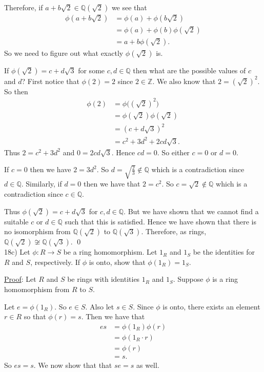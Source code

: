 \documentclass{article}
\begin{document}
Therefore, if $a + b\sqrt{2} \in \mathbb{Q}(\sqrt{2})$ we see that 
\begin{align*}
	\phi(a + b\sqrt{2}) &= \phi(a) + \phi(b\sqrt{2}) \\
	&= \phi(a) + \phi(b) \phi(\sqrt{2}) \\
	&= a + b \phi(\sqrt{2}).
\end{align*}
So we need to figure out what exactly $\phi(\sqrt{2})$ is.

If $\phi(\sqrt{2}) = c + d\sqrt{3}$ for some $c, d \in \mathbb{Q}$ then what are the possible values of $c$ and $d$? First notice that $\phi(2) = 2$ since $2 \in \mathbb{Z}$. We also know that $2 = (\sqrt{2})^2$. So then 
\begin{align*} 
	\phi(2)  &= \phi \big( (\sqrt{2})^2 \big) \\
	&= \phi(\sqrt{2}) \phi(\sqrt{2}) \\
	&= (c+d\sqrt{3})^2 \\
	&= c^2 + 3d^2 + 2cd\sqrt{3}.
\end{align*}
Thus $2 = c^2 + 3d^2$ and $0 = 2cd\sqrt{3}$. Hence $cd = 0$. So either $c = 0$ or $d = 0$. 

If $c = 0$ then we have $2 = 3d^2$. So $d = \sqrt{\frac 23} \not \in \mathbb{Q}$ which is a contradiction since $d \in \mathbb{Q}$. Similarly, if $d = 0$ then we have that $2 = c^2$. So $c = \sqrt 2 \not \in \mathbb{Q}$ which is a contradiction since $c \in \mathbb{Q}$.

Thus $\phi(\sqrt{2}) = c + d\sqrt{3}$ for $c, d \in \mathbb{Q}$. But we have shown that we cannot find a suitable $c$ or $d \in \mathbb{Q}$ such that this is satisfied. Hence we have shown that there is no isomorphism from $\mathbb{Q}(\sqrt{2})$ to $\mathbb{Q}(\sqrt{3})$. Therefore, as rings, $\mathbb{Q}(\sqrt{2}) \not \cong \mathbb{Q}(\sqrt{3})$. \qed \\

\pagebreak 18c) Let $\phi : R \to S$ be a ring homomorphism. Let $1_R$ and $1_S$ be the identities for $R$ and $S$, respectively. If $\phi$ is onto, show that $\phi(1_R) = 1_S$. 

\underline{Proof}: Let $R$ and $S$ be rings with identities $1_R$ and $1_S$. Suppose $\phi$ is a ring homomorphism from $R$ to $S$.

Let $e = \phi(1_R)$. So $e \in S$. Also let $s \in S$. Since $\phi$ is onto, there exists an element $r \in R$ so that $\phi(r) = s$. Then we have that
\begin{align*}
	es &= \phi(1_R) \phi(r) \\
	&= \phi(1_R \cdot r) \\
	&= \phi(r) \\
	&= s.
\end{align*}
So $es = s$. We now show that that $se = s$ as well. 
\end{document}
